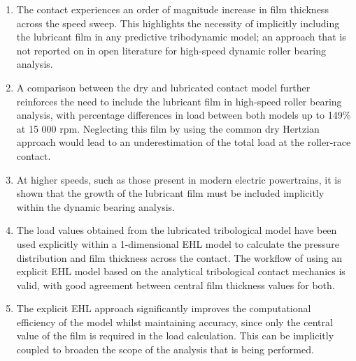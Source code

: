 \begin{enumerate}
	\item The contact experiences an order of magnitude increase in film thickness across the speed sweep. This highlights the necessity of implicitly including the lubricant film in any predictive tribodynamic model; an approach that is not reported on in open literature for high-speed dynamic roller bearing analysis.
	\item A comparison between the dry and lubricated contact model further reinforces the need to include the lubricant film in high-speed roller bearing analysis, with percentage differences in load between both models up to 149\% at 15 000 rpm. Neglecting this film by using the common dry Hertzian approach would lead to an underestimation of the total load at the roller-race contact. 
	\item At higher speeds, such as those present in modern electric powertrains, it is shown that the growth of the lubricant film must be included implicitly within the dynamic bearing analysis.
	\item The load values obtained from the lubricated tribological model have been used explicitly within a 1-dimensional EHL model to calculate the pressure distribution and film thickness across the contact. The workflow of using an explicit EHL model based on the analytical tribological contact mechanics is valid, with good agreement between central film thickness values for both. 
	\item The explicit EHL approach significantly improves the computational efficiency of the model whilst maintaining accuracy, since only the central value of the film is required in the load calculation. This can be implicitly coupled to broaden the scope of the analysis that is being performed.
\end{enumerate}